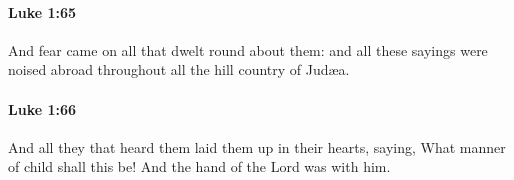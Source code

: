 		\paragraph{Luke 1:65} %
			\label{LUKE-1-65}

			And fear came on all that dwelt round about them: and all these sayings were noised abroad throughout all the hill country of Judæa.

			\begin{framed}
			\scriptsize
				\begin{compactdesc}
					\item[SBLG] 
				\end{compactdesc}
			\end{framed}

		\paragraph{Luke 1:66} %
			\label{LUKE-1-66}

			And all they that heard them laid them up in their hearts, saying, What manner of child shall this be! And the hand of the Lord was with him.

